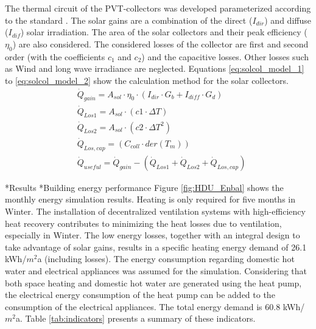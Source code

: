 \documentclass[twocolumn, a4paper,10pt]{article}
\makeatletter
\renewcommand\section{\@startsection{section}{1}{\z@}{3pt}{3pt}{\normalfont\large\bfseries}}
\renewcommand\subsection{\@startsection{subsection}{1}{\z@}{\z@}{\z@}{\normalfont\normalsize\bfseries}}
\renewcommand\subsection{\@startsection{subsection}{1}{\z@}{\z@}{0.1pt}{\normalfont\normalsize\bfseries}}
\makeatother
\begin{document}
The thermal circuit of the PVT-collectors was developed parameterized according to the standard \citet{ISO9806}. The solar gains are a combination of the direct ($I_{dir}$) and diffuse ($I_{dif}$) solar irradiation. The area of the solar collectors and their peak efficiency ($\eta_0$) are also considered. The considered losses of the collector are first and second order (with the coefficients $c_1$ and $c_2$) and the capacitive losses. Other losses such as Wind and long wave irradiance are neglected. Equations \ref{eq:solcol_model_1} to \ref{eq:solcol_model_2} show the calculation method for the solar collectors. \\

\begingroup
\vspace{-10pt}
\allowdisplaybreaks
\begin{align}
&\dot{Q}_{gain} = A_{sol} \cdot \eta_0 \cdot (I_{dir} \cdot G_b + I_{diff} \cdot G_d)\\
\label{eq:solcol_model_1}
&\dot{Q}_{Los1}=A_{sol} \cdot (c1 \cdot \Delta T)\\
&\dot{Q}_{Los2}=A_{sol} \cdot (c2 \cdot \Delta T^2)\\
&\dot{Q}_{Los,cap}=(C_{coll} \cdot der(T_m))\\
&\dot{Q}_{useful} = \dot{Q}_{gain}-(\dot{Q}_{Los1} + \dot{Q}_{Los2} + \dot{Q}_{Los,cap})
\label{eq:solcol_model_2}
\end{align} 
\endgroup

\section*{Results}
\subsection*{Building energy performance}
Figure \ref{fig:HDU_Enbal} shows the monthly energy simulation results. Heating is only required for five months in Winter. The installation of decentralized ventilation systems with high-efficiency heat recovery contributes to minimizing the heat losses due to ventilation, especially in Winter. The low energy losses, together with an integral design to take advantage of solar gains, results in a specific heating energy demand of 26.1 kWh/$m^2$a (including losses). The energy consumption regarding domestic hot water and electrical appliances was assumed for the simulation. Considering that both space heating and domestic hot water are generated using the heat pump, the electrical energy consumption of the heat pump can be added to the consumption of the electrical appliances. The total energy demand is 60.8 kWh/$m^2$a. Table \ref{tab:indicators} presents a summary of these indicators. 
\end{document}
